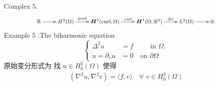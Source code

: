 Complex 5.
 \begin{equation}\label{CA2}
	\resizebox{0.8\hsize}{!}{$
		\begin{array}{c}
			\xymatrix{	
\mathbb{R} \ar[r] & H^{2}(\Omega)\ar[r]^-{\grad} & \boldsymbol{H}^{1}(\curl,\Omega)  \ar[r]^-{\curl}
				& \boldsymbol{H}^{1}(\Omega;\mathbb{R}^{3})    \ar[r]^-{\div} & L^2(\Omega) \ar[r]^{} & 0 .
 }
		\end{array}
		$}
	\end{equation}
Example 5 :The biharmonic equation
\begin{equation}
\left\{
\begin{aligned}
\Delta^{2}u&=f\qquad \,\,\,\mathrm{in}\,\,\Omega,\\
u=\partial_{\upsilon}u&=0 \quad \mathrm{on}\,\, \partial\Omega
\end{aligned}%
\right.   \label{eqtwo}
\end{equation}%
原始变分形式为
找 $u\in H_{0}^{2}(\Omega)$
 使得
\begin{align}\label{AA0}
(\nabla^{2}u,\nabla^{2}v)=\langle f,v\rangle \quad \forall\,\, v\in H_{0}^{2}(\Omega)
\end{align}